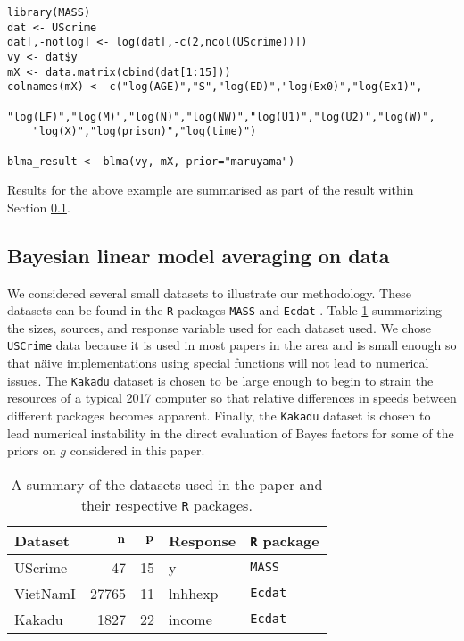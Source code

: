 \documentclass[12pt]{article}
\def\vectorfontone{\bf}
\def\vn{{\vectorfontone n}}                      %
\def\vp{{\vectorfontone p}}                      %
\begin{document}
\begin{verbatim}
library(MASS)
dat <- UScrime
dat[,-notlog] <- log(dat[,-c(2,ncol(UScrime))])
vy <- dat$y
mX <- data.matrix(cbind(dat[1:15]))
colnames(mX) <- c("log(AGE)","S","log(ED)","log(Ex0)","log(Ex1)",
    "log(LF)","log(M)","log(N)","log(NW)","log(U1)","log(U2)","log(W)",
    "log(X)","log(prison)","log(time)") 

blma_result <- blma(vy, mX, prior="maruyama")
\end{verbatim}

\noindent Results for the above example are summarised as part of the result within Section 
\ref{sec:BLMA}.

\subsection{Bayesian linear model averaging on data}\label{sec:BLMA}

We considered several small datasets to illustrate our methodology. These datasets
can be found in the {\tt R} packages {\tt MASS} \citep{Venables2002} and 
{\tt Ecdat} \citep{Croissant2016}. Table \ref{tab:datasets} summarizing the sizes,  
sources, and response variable used for each dataset used. 
We chose {\tt USCrime} data because it is used in most papers in
the area and is small enough so that n\"aive implementations using special functions will
not lead to numerical issues. The 
 {\tt Kakadu} dataset is chosen to
be large enough to begin to strain the resources of a typical 2017 computer so that
relative differences in speeds between different packages becomes apparent. Finally, the
{\tt Kakadu} dataset is chosen to lead numerical instability in the direct evaluation of Bayes
factors for some of the priors on $g$ considered in this paper.

\begin{table}[h]
	\begin{center}
\begin{tabular}{l|r|r|l|l}
{\bf Dataset}	& $\vn$ & $\vp$ & Response & {\bf {\tt R} package} \\ 
	\hline 
UScrime 	& 47 & 15 & y & {\tt MASS} \\  
VietNamI	& 27765 & 11 & lnhhexp & {\tt Ecdat}  \\ 
Kakadu	& 1827 & 22 & income & {\tt Ecdat}   \\  
\end{tabular} 
	\end{center}
\caption{A summary of the datasets used in the paper and their respective {\tt R} packages.}
\label{tab:datasets}
\end{table}
 
\end{document}
